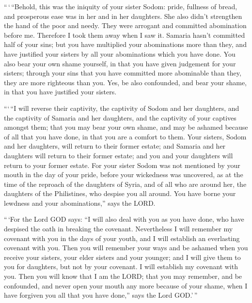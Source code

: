  ``\,`\,``Behold, this was the iniquity of your sister
Sodom: pride, fullness of bread, and prosperous ease was in her and in
her daughters. She also didn't strengthen the hand of the poor and
needy.  They were arrogant and committed abomination before
me. Therefore I took them away when I saw it.  Samaria
hasn't committed half of your sins; but you have multiplied your
abominations more than they, and have justified your sisters by all your
abominations which you have done.  You also bear your own
shame yourself, in that you have given judgement for your sisters;
through your sins that you have committed more abominable than they,
they are more righteous than you. Yes, be also confounded, and bear your
shame, in that you have justified your sisters.

 ```\,``I will reverse their captivity, the captivity of
Sodom and her daughters, and the captivity of Samaria and her daughters,
and the captivity of your captives amongst them;  that you
may bear your own shame, and may be ashamed because of all that you have
done, in that you are a comfort to them.  Your sisters,
Sodom and her daughters, will return to their former estate; and Samaria
and her daughters will return to their former estate; and you and your
daughters will return to your former estate.  For your
sister Sodom was not mentioned by your mouth in the day of your pride,
 before your wickedness was uncovered, as at the time of
the reproach of the daughters of Syria, and of all who are around her,
the daughters of the Philistines, who despise you all around.
 You have borne your lewdness and your abominations,'' says
the LORD.

 ``\,`For the Lord GOD says: ``I will also deal with you as
you have done, who have despised the oath in breaking the covenant.
 Nevertheless I will remember my covenant with you in the
days of your youth, and I will establish an everlasting covenant with
you.  Then you will remember your ways and be ashamed when
you receive your sisters, your elder sisters and your younger; and I
will give them to you for daughters, but not by your covenant.
 I will establish my covenant with you. Then you will know
that I am the LORD;  that you may remember, and be
confounded, and never open your mouth any more because of your shame,
when I have forgiven you all that you have done,'' says the Lord
GOD.'\,''

